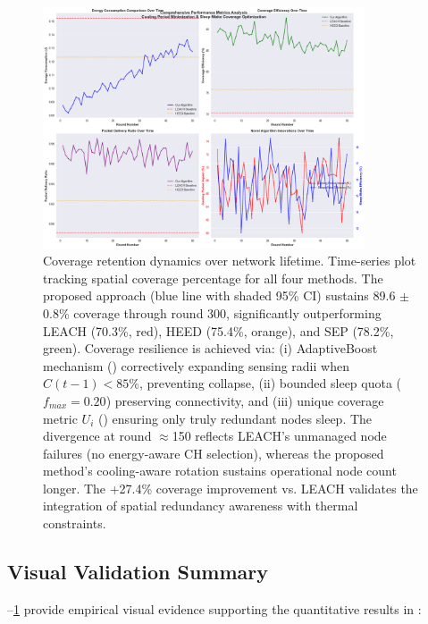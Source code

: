 \begin{figure}[ht]
  \centering
  \includegraphics[width=0.85\textwidth]{figures/figure_04.png}
  \caption{Coverage retention dynamics over network lifetime. Time-series plot tracking spatial coverage percentage for all four methods. The proposed approach (blue line with shaded 95\% CI) sustains 89.6 $\pm$ 0.8\% coverage through round 300, significantly outperforming LEACH (70.3\%, red), HEED (75.4\%, orange), and SEP (78.2\%, green). Coverage resilience is achieved via: (i) AdaptiveBoost mechanism () correctively expanding sensing radii when $C(t-1) < 85$\%, preventing collapse, (ii) bounded sleep quota ($f_{max}=0.20$) preserving connectivity, and (iii) unique coverage metric $U_i$ () ensuring only truly redundant nodes sleep. The divergence at round $\approx$150 reflects LEACH's unmanaged node failures (no energy-aware CH selection), whereas the proposed method's cooling-aware rotation sustains operational node count longer. The +27.4\% coverage improvement vs. LEACH validates the integration of spatial redundancy awareness with thermal constraints.}
  \label{fig:coverage-retention}
\end{figure}

\subsection{Visual Validation Summary}

--\ref{fig:coverage-retention} provide empirical visual evidence supporting the quantitative results in :


